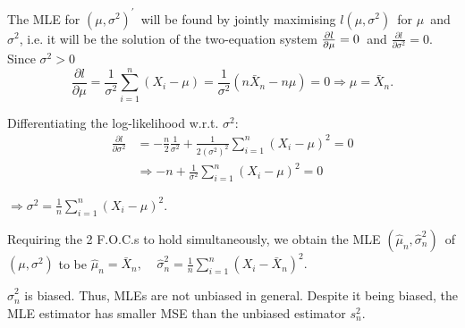 \documentclass[notes=show]{beamer}
\begin{document}
\begin{frame}%


\begin{example}
The MLE for $\left( \mu ,\sigma ^{2}\right) ^{\prime }$\ will be found by
jointly maximising $l\left( \mu ,\sigma ^{2}\right) $\ for $\mu $\ and $%
\sigma ^{2}$, i.e. it will be the solution of the two-equation system $\frac{%
\partial l}{\partial \mu }=0$\ and $\frac{\partial l}{\partial \sigma ^{2}}%
=0 $. Since $\sigma ^{2}>0$\ 
\begin{equation*}
\frac{\partial l}{\partial \mu }=\frac{1}{\sigma ^{2}}\sum_{i=1}^{n}\left(
X_{i}-\mu \right) =\frac{1}{\sigma ^{2}}\left( n\bar{X}_{n}-n\mu \right)
=0\Longrightarrow \mu =\bar{X}_{n}.
\end{equation*}

Differentiating the log-likelihood w.r.t. $\sigma ^{2}:$%
\begin{align*}
\frac{\partial l}{\partial \sigma ^{2}}& =-\frac{n}{2}\frac{1}{\sigma ^{2}}+%
\frac{1}{2\left( \sigma ^{2}\right) ^{2}}\sum_{i=1}^{n}\left( X_{i}-\mu
\right) ^{2}=0 \\
& \Longrightarrow -n+\frac{1}{\sigma ^{2}}\sum_{i=1}^{n}\left( X_{i}-\mu
\right) ^{2}=0
\end{align*}
\end{example}

\end{frame}%

\begin{frame}%


\begin{example}
$\Longrightarrow \sigma ^{2}=\frac{1}{n}\sum_{i=1}^{n}\left( X_{i}-\mu
\right) ^{2}.$

Requiring the 2 F.O.C.s to hold simultaneously, we obtain the MLE $\left( 
\hat{\mu}_{n},\hat{\sigma}_{n}^{2}\right) $\ of $\left( \mu ,\sigma
^{2}\right) $ to be $\hat{\mu}_{n}=\bar{X}_{n},\;\;\;\;\hat{\sigma}_{n}^{2}=%
\frac{1}{n}\sum_{i=1}^{n}\left( X_{i}-\bar{X}_{n}\right) ^{2}.$
\end{example}

\begin{remark}

$\hat{\sigma}_{n}^{2}$ is biased. Thus, MLEs are not unbiased in general.
Despite it being biased, the MLE estimator has smaller MSE than the unbiased
estimator $s_{n}^{2}$.

\end{remark}

\end{frame}%
\end{document}
